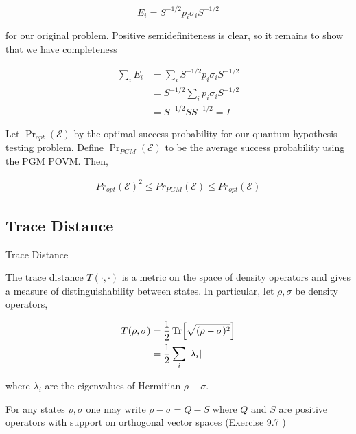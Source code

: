 \documentclass[main.tex]{subfiles}
\begin{document}
\begin{subappendices}
$$E_i = S^{-1/2}p_i \sigma_i S^{-1/2}$$ 

for our original problem. Positive semidefiniteness is clear, so it remains to show that we have completeness

\begin{align*}
\sum_i E_i &= \sum_i S^{-1/2}p_i \sigma_i S^{-1/2}\\
&=  S^{-1/2} \sum_i p_i \sigma_i S^{-1/2} \\
&= S^{-1/2} S S^{-1/2} = I
\end{align*}

\begin{theorem}
Let $\Pr_{opt}(\mathcal{E})$ by the optimal success probability for our 	quantum hypothesis testing problem. Define $\Pr_{PGM}(\mathcal{E})$ to be the average success probability using the PGM POVM. Then,

\begin{align*}
Pr_{opt}(\mathcal{E})^2 \leq Pr_{PGM}(\mathcal{E}) \leq 	Pr_{opt}(\mathcal{E})
\end{align*}

\end{theorem}

\subsection{Trace Distance}

\begin{definition}
Trace Distance

The trace distance $T(\cdot , \cdot)$ is a metric on the space of density operators and gives a measure of distinguishability between states. In particular, let $\rho, \sigma$ be density operators,

\begin{align*}
	T(\rho, \sigma) &= \frac{1}{2} \Tr [\sqrt{(\rho - \sigma)^2}] \\
	&= \frac{1}{2} \sum_i |\lambda_i|
\end{align*}

where $\lambda_i$ are the eigenvalues of Hermitian $\rho - \sigma$.

\end{definition}

\begin{lemma}
For any states $\rho, \sigma$ one may write $\rho - \sigma = Q - S$ where $Q$ and $S$ are positive operators with support on orthogonal vector spaces	(Exercise 9.7 \cite{nielsen2010quantum})
\end{lemma}


\end{subappendices}
\end{document}
